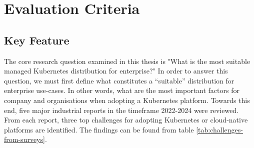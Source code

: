 \chapter{Evaluation Criteria}\label{chap:evaluation-criteria}

\section{Key Feature}


The core research question examined in this thesis is "What is the most suitable managed Kubernetes distribution for enterprise?" In order to answer this question, we must first define what constitutes a “suitable” distribution for enterprise use-cases. In other words, what are the most important factors for company and organisations when adopting a Kubernetes platform. Towards this end, five major industrial reports in the timeframe 2022-2024 were reviewed. From each report, three top challenges for adopting Kubernetes or cloud-native platforms are identified. The findings can be found from table \ref{tab:challenges-from-surveys}.


